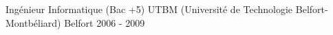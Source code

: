 \begin{cventries}
  \cventry
    {Ingénieur Informatique (Bac +5)}
    {UTBM (Université de Technologie Belfort-Montbéliard)}
    {Belfort}
    {2006 - 2009}
    {}
\end{cventries}
